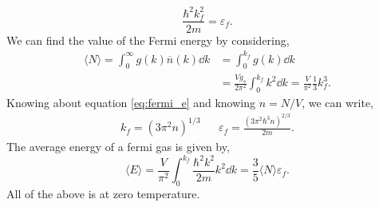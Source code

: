 \documentclass{book}
\begin{document}
\begin{equation}
	\frac{\hbar^2k_f^2}{2m} = \varepsilon_f. \label{eq:fermi_e}
\end{equation}
We can find the value of the Fermi energy by considering,
\begin{equation}
	\begin{split}
		\langle N \rangle = \int_0^{\infty}g(k) \overline{n}(k)\dd{k} &= \int_0^{k_f}g(k)\dd{k} \\
		& = \frac{Vg_s}{2\pi^2}\int_0^{k_f}k^2\dd{k} = \frac{V}{\pi^2}\frac{1}{3}k_f^3.
	\end{split}
\end{equation}
Knowing about equation \eqref{eq:fermi_e} and knowing $n = N/V$, we can write,
\begin{align}
	k_f = (3\pi^2n)^{1/3} && \varepsilon_f = \frac{(3\pi^2\hbar^3n)^{2/3}}{2m}.
\end{align}
The average energy of a fermi gas is given by,
\begin{equation}
	\langle E \rangle  = \frac{V}{\pi^2}\int_0^{k_f}\frac{\hbar^2k^2}{2m}k^2\dd{k} = \frac{3}{5}\langle N \rangle \varepsilon_f.
\end{equation}
All of the above is at zero temperature.
\end{document}
